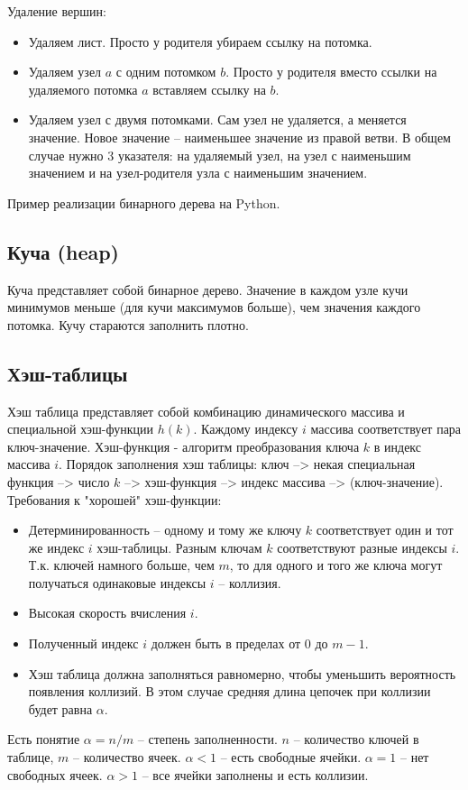 \documentclass{article}
\begin{document}
Удаление вершин:
\begin{itemize}
    \item Удаляем лист. Просто у родителя убираем ссылку на потомка.
    \item Удаляем узел $a$ с одним потомком $b$. Просто у родителя вместо ссылки на удаляемого потомка $a$ вставляем ссылку на $b$.
    \item Удаляем узел с двумя потомками. Сам узел не удаляется, а меняется значение. Новое значение -- наименьшее значение из правой ветви.
В общем случае нужно 3 указателя: на удаляемый узел, на узел с наименьшим значением и на узел-родителя узла с наименьшим значением.
\end{itemize}

Пример реализации бинарного дерева на Python.


\subsection{Куча (heap)}

Куча представляет собой бинарное дерево. Значение в каждом узле кучи минимумов меньше (для кучи максимумов больше), чем значения каждого потомка.
Кучу стараются заполнить плотно.




\subsection{Хэш-таблицы}
Хэш таблица представляет собой комбинацию динамического массива и специальной хэш-функции $h(k)$. Каждому индексу $i$ массива соответствует пара ключ-значение.
Хэш-функция - алгоритм преобразования ключа $k$ в индекс массива $i$.
Порядок заполнения хэш таблицы: ключ --> некая специальная функция --> число $k$ --> хэш-функция --> индекс массива --> (ключ-значение).
Требования к "хорошей" хэш-функции:
\begin{itemize}
    \item Детерминированность -- одному и тому же ключу $k$ соответствует один и тот же индекс $i$ хэш-таблицы. Разным ключам $k$ соответствуют разные индексы $i$.
Т.к. ключей намного больше, чем $m$, то для одного и того же ключа могут получаться одинаковые индексы $i$ -- коллизия.
    \item Высокая скорость вчисления $i$.
    \item Полученный индекс $i$ должен быть в пределах от 0 до $m - 1$.
    \item Хэш таблица должна заполняться равномерно, чтобы уменьшить вероятность появления коллизий. В этом случае средняя длина
    цепочек при коллизии будет равна $\alpha$.
\end{itemize}
Есть понятие $\alpha = n / m$ -- степень заполненности. $n$ -- количество ключей в таблице, $m$ -- количество ячеек. $\alpha < 1$ -- есть свободные ячейки. $\alpha = 1$ -- нет свободных ячеек.
$\alpha > 1$ -- все ячейки заполнены и есть коллизии.
\end{document}

